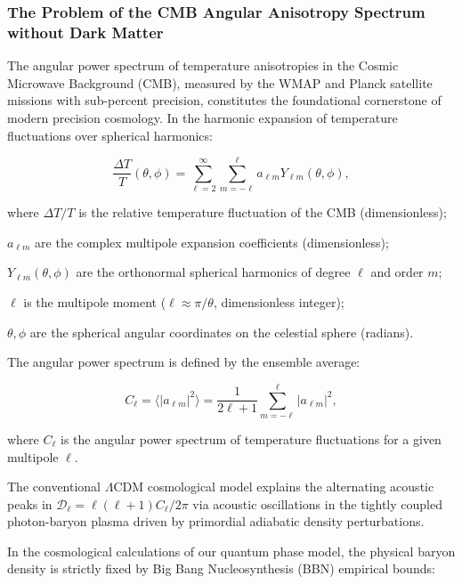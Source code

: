\documentclass[11pt,a4paper]{article}
\theoremstyle{definition}
\begin{document}
\subsubsection{The Problem of the CMB Angular Anisotropy Spectrum without Dark Matter}\label{sec:4.4.1}

The angular power spectrum of temperature anisotropies in the Cosmic Microwave Background (CMB), measured by the WMAP and Planck satellite missions with sub-percent precision, constitutes the foundational cornerstone of modern precision cosmology. In the harmonic expansion of temperature fluctuations over spherical harmonics:

\begin{equation}\label{eq:4.39}\tag{4.39}
\frac{\Delta T}{T}(\theta, \phi) = \sum_{\ell=2}^{\infty} \sum_{m=-\ell}^{\ell} a_{\ell m} Y_{\ell m}(\theta, \phi),
\end{equation}

where $\Delta T / T$ is the relative temperature fluctuation of the CMB (dimensionless);  

$a_{\ell m}$ are the complex multipole expansion coefficients (dimensionless);  

$Y_{\ell m}(\theta, \phi)$ are the orthonormal spherical harmonics of degree $\ell$ and order $m$;  

$\ell$ is the multipole moment ($\ell \approx \pi / \theta$, dimensionless integer);  

$\theta, \phi$ are the spherical angular coordinates on the celestial sphere (radians).

The angular power spectrum is defined by the ensemble average:

\begin{equation}\label{eq:4.40}\tag{4.40}
C_\ell = \langle |a_{\ell m}|^2 \rangle = \frac{1}{2\ell+1} \sum_{m=-\ell}^\ell |a_{\ell m}|^2,
\end{equation}

where $C_\ell$ is the angular power spectrum of temperature fluctuations for a given multipole $\ell$.

The conventional $\Lambda\text{CDM}$ cosmological model explains the alternating acoustic peaks in $\mathcal{D}_\ell = \ell(\ell+1)C_\ell / 2\pi$ via acoustic oscillations in the tightly coupled photon-baryon plasma driven by primordial adiabatic density perturbations.

In the cosmological calculations of our quantum phase model, the physical baryon density is strictly fixed by Big Bang Nucleosynthesis (BBN) empirical bounds:
\end{document}
